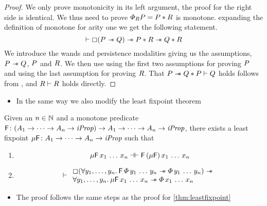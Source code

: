 \documentclass[thesis.tex]{subfiles}
\begin{document}
\begin{proof}
    We only prove monotonicity in its left argument, the proof for the right side is identical.
    We thus need to prove $\varPhi_RP = P * R$ is monotone.
    expanding the definition of monotone for arity one we get the following statement.
    \[\vdash \mathop{\boxempty}(P \mathrel{-\!\!\ast} Q) \mathrel{-\!\!\ast} P * R \mathrel{-\!\!\ast} Q * R\]
    We introduce the wands and persistence modalities giving us the assumptions, $P\mathrel{-\!\!\ast}Q$, $P$ and $R$.
    We then use  using the first two assumptions for proving $P$ and using the last assumption for proving $R$.
    That $P \mathrel{-\!\!\ast} Q * P \vdash Q$ holds follows from , and $R \vdash R$ holds directly.
\end{proof}
\begin{itemize}
    \item In the same way we also modify the least fixpoint theorem
\end{itemize}

\begin{theorem}
    \label{thm:leastfixpointmar}
    Given an $n\in\mathbb{N}$ and a monotone predicate $\textsf{\upshape F}\colon (A_1 \to \dots \to A_n \to \textit{iProp}) \to  A_1 \to \dots \to A_n \to \textit{iProp}$, there exists a least fixpoint $\mu\textsf{\upshape F}\colon A_1 \to \dots \to A_n \to \textit{iProp}$ such that
    \begin{enumerate}
        \item \[ \mu\textsf{\upshape F}\, x_1\,\dots\,x_n \mathrel{\dashv\vdash} \textsf{\upshape F}\, (\mu\textsf{\upshape F})\, x_1\,\dots\,x_n \]
        \item \[
                  \proves \begin{array}{l}
                      \always (\All \varB_1,\dots,\varB_n. \hopred\, \pred\, \varB_1\,\dots\,\varB_n \wand \pred\, \varB_1\,\dots\,\varB_n) \wand \\
                      \All \varB_1,\dots,\varB_n. \lfp\hopred\, \var_1\,\dots\,\var_n \wand \pred\, \var_1\,\dots\,\var_n
                  \end{array}
              \]
    \end{enumerate}
\end{theorem}
\begin{itemize}
    \item The proof follows the same steps as the proof for \cref*{thm:leastfixpoint}
\end{itemize}
\end{document}
